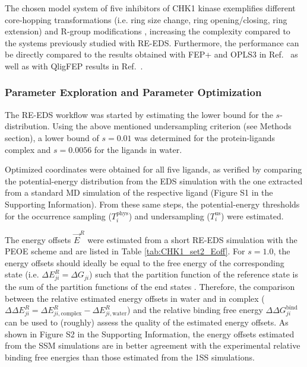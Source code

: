 The chosen model system of five inhibitors of CHK1 kinase exemplifies different core-hopping transformations (i.e. ring size change, ring opening/closing, ring extension) and R-group modifications \cite{Wang2017}, increasing the complexity compared to the systems previously studied with RE-EDS. Furthermore, the performance can be directly compared to the results obtained with FEP+ and OPLS3 in Ref.~\cite{Wang2017} as well as with QligFEP results in Ref.~\cite{Jespers2019}.

\subsubsection{Parameter Exploration and Parameter Optimization}
The RE-EDS workflow was started by estimating the lower bound for the $s$-distribution. Using the above mentioned undersampling criterion (see Methods section), a lower bound of $s=0.01$ was determined for the protein-ligands complex and $s=0.0056$ for the ligands in water. 

Optimized coordinates were obtained for all five ligands, as verified by comparing the potential-energy distribution from the EDS simulation with the one extracted from a standard MD simulation of the respective ligand (Figure S1 in the Supporting Information). %
From these same steps, the potential-energy thresholds for the occurrence sampling ($T_{i}^{\text{phys}}$) and undersampling ($T_{i}^{\text{us}}$) were estimated.

The energy offsets $\vec{E}^R$ were estimated from a short RE-EDS simulation with the PEOE \cite{Sidler2016} scheme and are listed in Table \ref{tab:CHK1_set2_Eoff}.
For $s=1.0$, the energy offsets should ideally be equal to the free energy of the corresponding state (i.e. $\Delta E^R_{ji} = \Delta G_{ji}$) such that the partition function of the reference state is the sum of the partition functions of the end states \cite{Christ2008}. Therefore, the comparison between the relative estimated energy offsets in water and in complex ($\Delta \Delta E^R_{ji} = \Delta E^R_{ji,\text{complex}} - \Delta E^R_{ji,\text{water}}$) and the relative binding free energy $\Delta \Delta G^\text{bind}_{ji}$ can be used to (roughly) assess the quality of the estimated energy offsets. As shown in Figure S2 in the Supporting Information, %
the energy offsets estimated from the SSM simulations are in better agreement with the experimental relative binding free energies than those estimated from the 1SS simulations.

